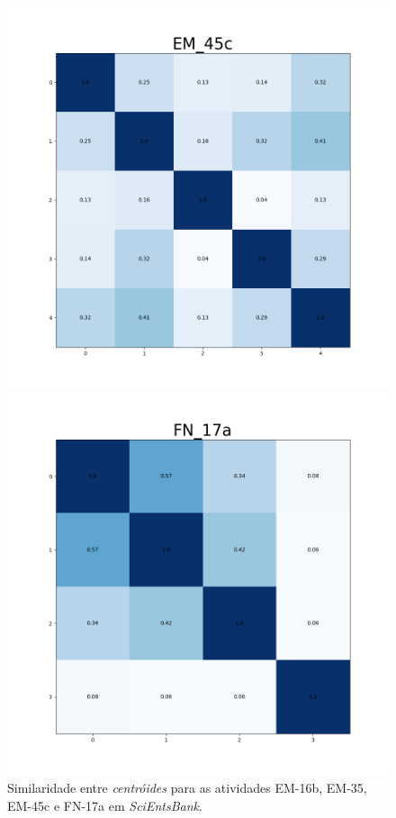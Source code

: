 \begin{figure}[!h]
\begin{minipage}[t]{.5\textwidth}
\end{minipage}%
\hfill
\begin{minipage}[t]{.5\textwidth}
\centering
\includegraphics[width=\textwidth]{figuras/hmEM45c.png}
\end{minipage}%
\begin{minipage}[t]{.5\textwidth}
\centering
\includegraphics[width=\textwidth]{figuras/hmFN17a.png}
\end{minipage}
\caption{Similaridade entre \textit{centróides} para as atividades EM-16b, EM-35, EM-45c e FN-17a em \textit{SciEntsBank}.}
\label{fig-hmSciEntsBank}
\end{figure}

